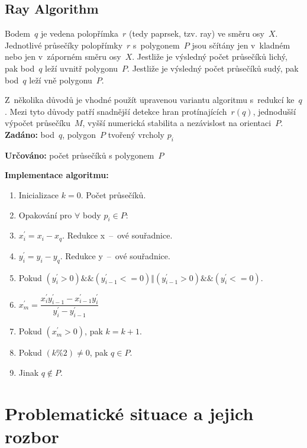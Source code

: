 \documentclass[a4paper, 12pt, oneside, titlepage]{article} %
\begin{document}
\subsection*{Ray Algorithm}
Bodem~$q$ je vedena polopřímka~$r$ (tedy paprsek, tzv. ray) ve směru osy~$X$. Jednotlivé průsečíky polopřímky~$r$ s~polygonem~$P$ jsou sčítány jen v~kladném nebo jen v~záporném směru osy~$X$. Jestliže je výsledný počet průsečíků lichý, pak bod~$q$ leží uvnitř polygonu~$P$. Jestliže je výsledný počet průsečíků sudý, pak bod~$q$ leží vně polygonu~$P$. 

Z~několika důvodů je vhodné použít upravenou variantu algoritmu s~redukcí ke~$q$. Mezi tyto důvody patří snadnější detekce hran protínajících~$r(q)$, jednodušší výpočet průsečíku~$M$, vyšší numerická stabilita a nezávislost na orientaci~$P$.\\

\noindent\textbf{Zadáno:} bod~$q$, polygon~$P$ tvořený vrcholy $p_i$

\noindent\textbf{Určováno:} počet průsečíků s polygonem~$P$

\noindent\textbf{Implementace algoritmu:}


\begin{enumerate}
  \item Inicializace $k = 0$. Počet průsečíků.
  \item Opakování pro $\forall$ body $p_i \in P$:
  \item \qquad $x^{'}_{i} = x_i - x_q$. Redukce x~--~ové souřadnice.
  \item \qquad $y^{'}_{i} = y_i - y_q$. Redukce y~--~ové souřadnice.
  \item \qquad Pokud $(y^{'}_{i} > 0)\&\&(y^{'}_{i-1} <= 0)\Vert(y^{'}_{i-1} > 0)\&\&(y^{'}_{i} <= 0)$.
  \item \qquad \qquad $x^{'}_{m} = \dfrac{x^{'}_{i} y^{'}_{i-1} - x^{'}_{i-1} y^{'}_{i}}{y^{'}_{i}-y^{'}_{i-1}}$
  \item \qquad \qquad Pokud $(x^{'}_{m} > 0)$, pak $k = k+1$.
  \item Pokud $(k\%2) \neq 0$, pak $q \in P$.
  \item Jinak $q \notin P$.
\end{enumerate}



\section*{Problematické situace a jejich rozbor}
\end{document}
